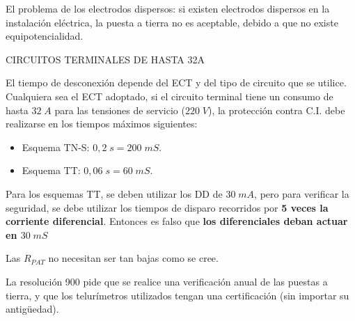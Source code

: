 
El problema de los electrodos dispersos: si existen electrodos dispersos en la instalación eléctrica, la puesta a tierra no es aceptable, debido a que no existe equipotencialidad.

CIRCUITOS TERMINALES DE HASTA 32A

El tiempo de desconexión depende del ECT y del tipo de circuito que se utilice.
Cualquiera sea el ECT adoptado, si el circuito terminal tiene un consumo de hasta $32\; A$ para las tensiones de servicio ($220\; V$), la protección contra C.I. debe realizarse en los tiempos máximos siguientes:

\begin{itemize}
	\item Esquema TN-S: $0,2\; s=200\; mS$.
	\item Esquema TT: $0,06\; s=60\; mS$.
\end{itemize} 

Para los esquemas TT, se deben utilizar los DD de $30\; mA$, pero para verificar la seguridad, se debe utilizar los tiempos de disparo recorridos por \textbf{5 veces la corriente diferencial}. Entonces es falso que \textbf{los diferenciales deban actuar en $30\; mS$}

Las $R_{PAT}$ no necesitan ser tan bajas como se cree.

La resolución 900 pide que se realice una verificación anual de las puestas a tierra, y que los telurímetros utilizados tengan una certificación (sin importar su antigüedad).

